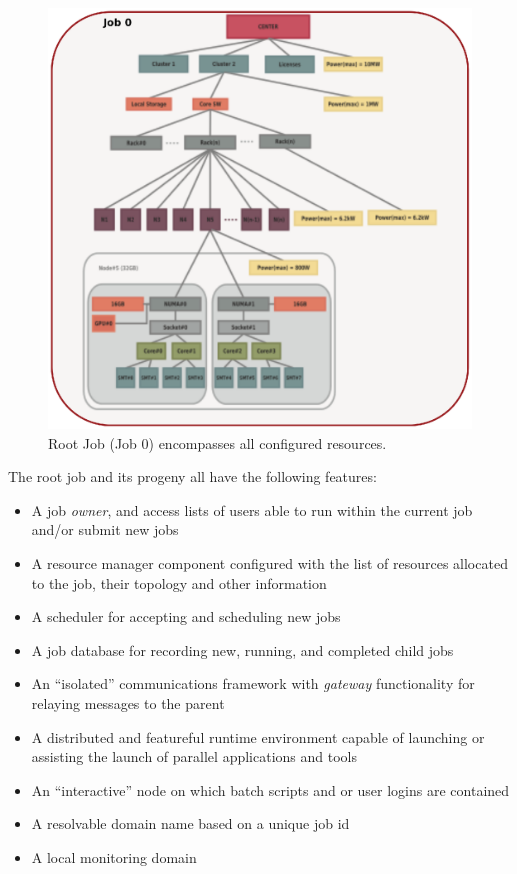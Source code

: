 \documentclass{article}
\begin{document}
\begin{figure}
\centering
\includegraphics[scale=0.5]{../fig/root_job.eps}
\caption{Root Job (Job 0) encompasses all configured resources.}
\label{fig:RootJob}
\end{figure}


The root job and its progeny all have the following features:

\begin{itemize}
\item{A job {\em owner}, and access lists of users able to run
      within the  current job and/or submit new jobs}
\item{A resource manager component configured with the list of
      resources allocated to the job, their topology and other information}
\item{A scheduler for accepting and scheduling new jobs}
\item{A job database for recording new, running, and completed child jobs}
\item{An ``isolated'' communications framework with {\em gateway} functionality
      for relaying messages to the parent}
\item{A distributed and featureful runtime environment capable of launching
      or assisting the launch of parallel applications and tools}
\item{An ``interactive'' node on which batch scripts and or user logins
       are contained}
\item{A resolvable domain name based on a unique job id}
\item{A local monitoring domain}
\end{itemize}
\end{document}
